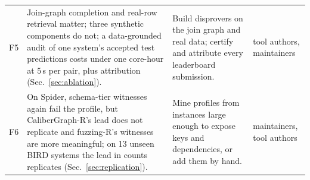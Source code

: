 \begin{table}[t]
\begin{tabularx}{\textwidth}{@{}l >{\raggedright\arraybackslash}X >{\raggedright\arraybackslash}X l@{}}
F5 & Join-graph completion and real-row retrieval matter; three synthetic components do not; a data-grounded audit of one system's accepted test predictions costs under one core-hour at 5\,s per pair, plus attribution (Sec.~\ref{sec:ablation}). & Build disprovers on the join graph and real data; certify and attribute every leaderboard submission. & tool authors, maintainers\\
F6 & On Spider, schema-tier witnesses again fail the profile, but CaliberGraph-R's lead does not replicate and fuzzing-R's witnesses are more meaningful; on 13 unseen BIRD systems the lead in counts replicates (Sec.~\ref{sec:replication}). & Mine profiles from instances large enough to expose keys and dependencies, or add them by hand. & maintainers, tool authors\\
\bottomrule
\end{tabularx}
\end{table}
